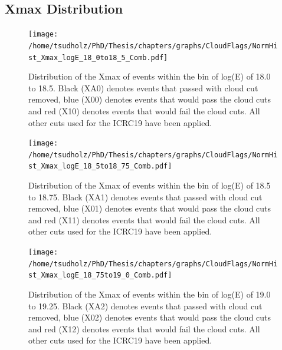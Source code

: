 %


\subsection{Xmax Distribution}




\begin{figure}[!p]
\centering
\texttt{[image: /home/tsudholz/PhD/Thesis/chapters/graphs/CloudFlags/NormHist\_Xmax\_logE\_18\_0to18\_5\_Comb.pdf]}
\caption{Distribution of the Xmax of events within the bin of log(E) of 18.0 to 18.5. Black (XA0) denotes events that passed with cloud cut removed, blue (X00) denotes events that would pass the cloud cuts and red (X10) denotes events that would fail the cloud cuts. All other cuts used for the ICRC19 have been applied.} \label{fig:CloudFlag_XmaxDist_18.0}
\end{figure}

\begin{figure}[!p]
\centering
\texttt{[image: /home/tsudholz/PhD/Thesis/chapters/graphs/CloudFlags/NormHist\_Xmax\_logE\_18\_5to18\_75\_Comb.pdf]}
\caption{Distribution of the Xmax of events within the bin of log(E) of 18.5 to 18.75. Black (XA1) denotes events that passed with cloud cut removed, blue (X01) denotes events that would pass the cloud cuts and red (X11) denotes events that would fail the cloud cuts. All other cuts used for the ICRC19 have been applied.}\label{fig:CloudFlag_XmaxDist_18.5}
\end{figure}

\begin{figure}[!p]
\centering
\texttt{[image: /home/tsudholz/PhD/Thesis/chapters/graphs/CloudFlags/NormHist\_Xmax\_logE\_18\_75to19\_0\_Comb.pdf]}
\caption{Distribution of the Xmax of events within the bin of log(E) of 19.0 to 19.25. Black (XA2) denotes events that passed with cloud cut removed, blue (X02) denotes events that would pass the cloud cuts and red (X12) denotes events that would fail the cloud cuts. All other cuts used for the ICRC19 have been applied.}\label{fig:CloudFlag_XmaxDist_18.75}
\end{figure}

